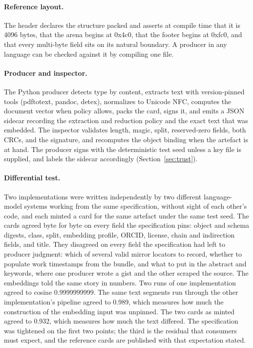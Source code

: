 \documentclass[11pt]{article}
\begin{document}
\paragraph{Reference layout.} The header declares the structure packed and
asserts at compile time that it is 4096 bytes, that the arena begins at 0x4c0,
that the footer begins at 0xfc0, and that every multi-byte field sits on its
natural boundary. A producer in any language can be checked against it by
compiling one file.

\paragraph{Producer and inspector.} The Python producer detects type by
content, extracts text with version-pinned tools (pdftotext, pandoc, detex),
normalizes to Unicode NFC, computes the document vector when policy allows,
packs the card, signs it, and emits a JSON sidecar recording the extraction
and reduction policy and the exact text that was embedded. The inspector
validates length, magic, split, reserved-zero fields, both CRCs, and the
signature, and recomputes the object binding when the artefact is at hand.
The producer signs with the deterministic test seed unless a key file is
supplied, and labels the sidecar accordingly (Section~\ref{sec:trust}).

\paragraph{Differential test.} Two implementations were written independently
by two different language-model systems working from the same specification,
without sight of each other's code, and each minted a card for the same
artefact under the same test seed. The cards agreed byte for byte on every
field the specification pins: object and schema digests, class, split,
embedding profile, ORCID, license, chain and indirection fields, and title.
They disagreed on every field the specification had left to producer judgment:
which of several valid mirror locators to record, whether to populate work
timestamps from the bundle, and what to put in the abstract and keywords,
where one producer wrote a gist and the other scraped the source. The
embeddings told the same story in numbers. Two runs of one implementation
agreed to cosine 0.9999999999. The same text segments run through the other
implementation's pipeline agreed to 0.989, which measures how much the
construction of the embedding input was unpinned. The two cards as minted
agreed to 0.932, which measures how much the text differed. The specification
was tightened on the first two points; the third is the residual that
consumers must expect, and the reference cards are published with that
expectation stated.
\end{document}
